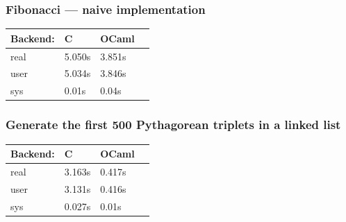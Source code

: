 \documentclass[aspectratio=169]{beamer}
\begin{document}


\begin{frame}
  \frametitle{Fibonacci --- naive implementation}
  \begin{table}
    \centering
    \begin{tabular}{l|lll}
      Backend: & C      & OCaml  & \\
      \hline
      real & 5.050s & 3.851s & \\
      user & 5.034s & 3.846s & \\
      sys  & 0.01s  & 0.04s  &
    \end{tabular}
  \end{table}
\end{frame}

\begin{frame}
  \frametitle{Generate the first 500 Pythagorean triplets in a linked list}
  \begin{table}
    \centering
    \begin{tabular}{l|lll}
      Backend: & C      & OCaml  & \\
      \hline
      real & 3.163s & 0.417s & \\
      user & 3.131s & 0.416s & \\
      sys  & 0.027s & 0.01s  &
    \end{tabular}
  \end{table}
\end{frame}
\end{document}
